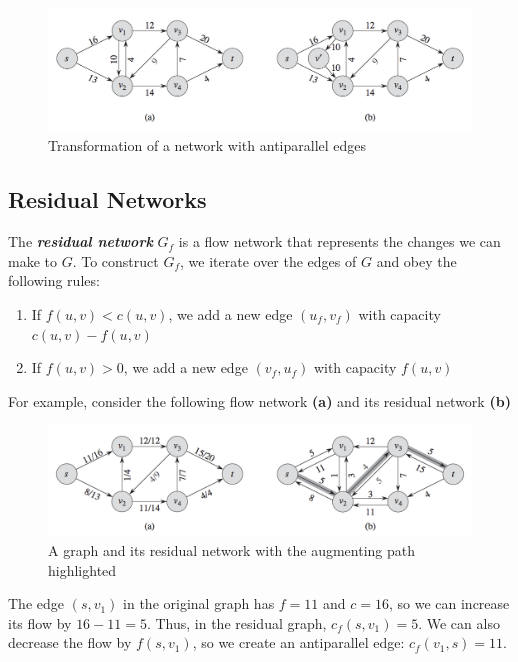 \documentclass[11pt, oneside]{article}
\newcommand{\smallemphasis}[1]{\textbf{\textit{#1}}}
\begin{document}
\begin{figure}[H]
\centering
\includegraphics[scale=0.75]{antiparallel}
\caption{Transformation of a network with antiparallel edges}
\end{figure}

\newpage
\subsection{Residual Networks}

The \smallemphasis{residual network} \( G_f \) is a flow network that represents the changes we can make to \( G \). To construct \( G_f \), we iterate over the edges of \( G \) and obey the following rules:

\begin{enumerate}
   \item If \( f(u, v) < c(u, v) \), we add a new edge \( (u_f, v_f) \) with capacity \( c(u, v) - f(u, v) \)

   \item If \( f(u, v) > 0 \), we add a new edge \( (v_f, u_f) \) with capacity \( f(u, v) \)
\end{enumerate}

For example, consider the following flow network \textbf{(a)} and its residual network \textbf{(b)}

\begin{figure}[h]
\centering
\includegraphics[scale=0.75]{residualnetwork}
\caption{A graph and its residual network with the augmenting path highlighted}
\end{figure}

The edge \( (s, v_1) \) in the original graph has \( f = 11 \) and \( c = 16 \), so we can increase its flow by \( 16 - 11 = 5 \). Thus, in the residual graph, \( c_f(s, v_1) = 5 \). We can also decrease the flow by \( f(s, v_1) \), so we create an antiparallel edge: \( c_f(v_1, s) = 11 \).
\end{document}
